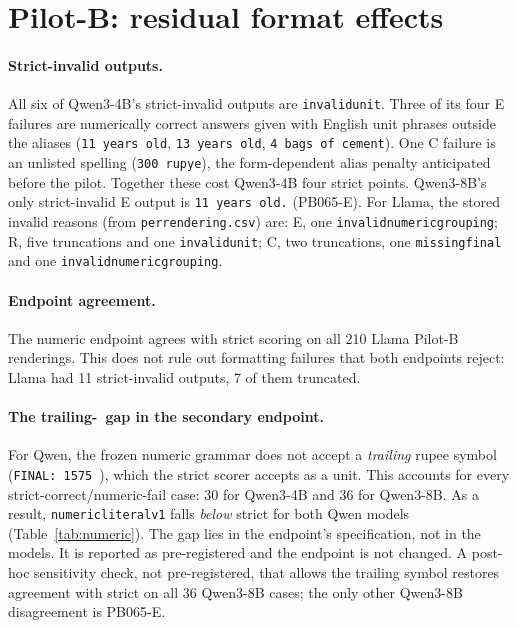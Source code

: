 \documentclass[12pt,a4paper,oneside]{report}
\renewcommand{\_}{\oldunderscore\allowbreak}
\newcommand{\rs}{\rupee}
\begin{document}
\section{Pilot-B: residual format effects}

\paragraph{Strict-invalid outputs.} All six of Qwen3-4B's strict-invalid outputs are \texttt{invalid\_unit}. Three of its four E failures are numerically correct answers given with English unit phrases outside the aliases (\texttt{11 years old}, \texttt{13 years old}, \texttt{4 bags of cement}). One C failure is an unlisted spelling (\texttt{300 rupye}), the form-dependent alias penalty anticipated before the pilot. Together these cost Qwen3-4B four strict points. Qwen3-8B's only strict-invalid E output is \texttt{11 years old.} (PB065-E). For Llama, the stored invalid reasons (from \texttt{per\_rendering.csv}) are: E, one \texttt{invalid\_numeric\_grouping}; R, five truncations and one \texttt{invalid\_unit}; C, two truncations, one \texttt{missing\_final} and one \texttt{invalid\_numeric\_grouping}.

\paragraph{Endpoint agreement.} The numeric endpoint agrees with strict scoring on all 210 Llama Pilot-B renderings. This does not rule out formatting failures that both endpoints reject: Llama had 11 strict-invalid outputs, 7 of them truncated.

\paragraph{The trailing-\rs\ gap in the secondary endpoint.} For Qwen, the frozen numeric grammar does not accept a \emph{trailing} rupee symbol (\texttt{FINAL: 1575 \rs}), which the strict scorer accepts as a unit. This accounts for every strict-correct/numeric-fail case: 30 for Qwen3-4B and 36 for Qwen3-8B. As a result, \texttt{numeric\_literal\_v1} falls \emph{below} strict for both Qwen models (Table~\ref{tab:numeric}). The gap lies in the endpoint's specification, not in the models. It is reported as pre-registered and the endpoint is not changed. A post-hoc sensitivity check, not pre-registered, that allows the trailing symbol restores agreement with strict on all 36 Qwen3-8B cases; the only other Qwen3-8B disagreement is PB065-E.
\end{document}
